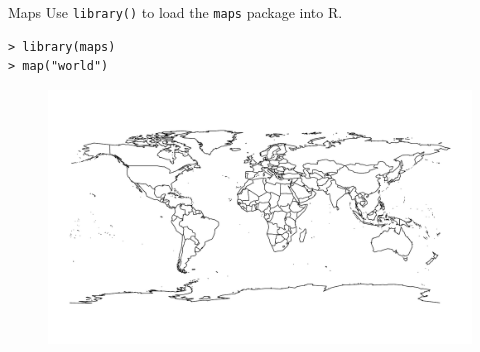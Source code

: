 \documentclass[10pt]{beamer}
\begin{document}
\begin{frame}[fragile]{Maps}
Use \texttt{library()} to load the \texttt{maps} package into R.\\

\begin{verbatim}
> library(maps) 
> map("world")
\end{verbatim}
\begin{figure}[htbp]
\centering
\includegraphics[scale=0.35]{figure/world.pdf}
\end{figure}
 
\end{frame}
\end{document}
